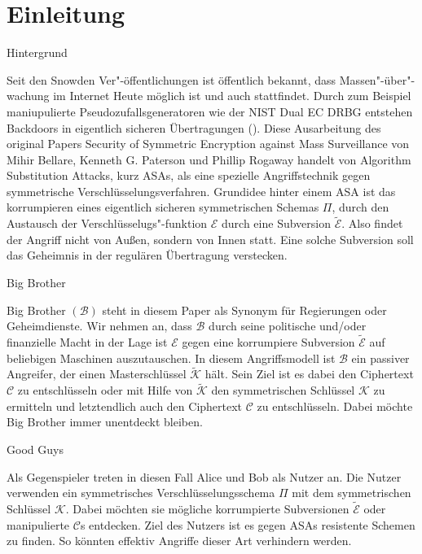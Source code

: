 \chapter{Einleitung}
\label{ch:Einleitung}

\begin{section}{Hintergrund}
\label{sec:hintergrund}

Seit den Snowden Ver"-öffentlichungen ist öffentlich bekannt, dass Massen"-über"-wachung im Internet Heute möglich ist und auch stattfindet. Durch zum Beispiel maniupulierte Pseudozufallsgeneratoren wie der NIST Dual EC DRBG entstehen Backdoors in eigentlich sicheren Übertragungen (\cite{dual}). Diese Ausarbeitung des original Papers Security of Symmetric Encryption against Mass Surveillance von Mihir Bellare, Kenneth G. Paterson und Phillip Rogaway handelt von Algorithm Substitution Attacks, kurz ASAs, als eine spezielle Angriffstechnik gegen symmetrische Verschlüsselungsverfahren. Grundidee hinter einem ASA ist das korrumpieren eines eigentlich sicheren symmetrischen Schemas $\Pi$, durch den Austausch der Verschlüsselugs"-funktion  $\mathcal{E}$ durch eine Subversion $\widetilde{\mathcal{E}}$. Also findet der Angriff nicht von Außen, sondern von Innen statt. Eine solche Subversion soll das Geheimnis in der regulären Übertragung verstecken.

\end{section}

\begin{section}{Big Brother}
\label{sec:big_brother}

Big Brother $(\mathscr{B})$ steht in diesem Paper als Synonym für Regierungen oder Geheimdienste. Wir nehmen an, dass $\mathscr{B}$  durch seine politische und/oder finanzielle Macht in der Lage ist $\mathcal{E}$ gegen eine korrumpiere Subversion $\widetilde{\mathcal{E}}$ auf beliebigen Maschinen auszutauschen. In diesem Angriffsmodell ist $\mathscr{B}$ ein passiver Angreifer, der einen Masterschlüssel $\widetilde{\mathcal{K}}$ hält. Sein Ziel ist es dabei den Ciphertext $\mathcal{C}$ zu entschlüsseln oder mit Hilfe von $\widetilde{\mathcal{K}}$ den symmetrischen Schlüssel $\mathcal{K}$ zu ermitteln und letztendlich auch den Ciphertext $\mathcal{C}$ zu entschlüsseln. Dabei möchte Big Brother immer unentdeckt bleiben.

\end{section}

\begin{section}{Good Guys}
\label{sec:good_guys}

Als Gegenspieler treten in diesen Fall Alice und Bob als Nutzer an. Die Nutzer verwenden ein symmetrisches Verschlüsselungsschema $\Pi$ mit dem symmetrischen Schlüssel $\mathcal{K}$. Dabei möchten sie mögliche korrumpierte Subversionen $\widetilde{\mathcal{E}}$ oder manipulierte $\mathcal{C}$s entdecken. Ziel des Nutzers ist es gegen ASAs resistente Schemen zu finden. So könnten effektiv Angriffe dieser Art verhindern werden.

\end{section}

